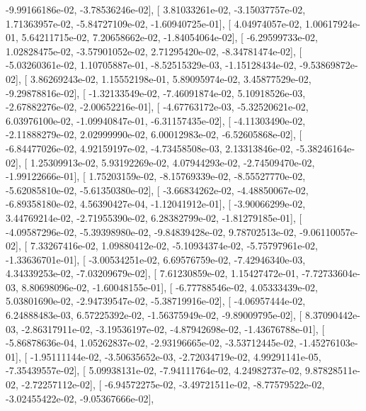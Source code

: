 \documentclass{article}
\begin{document}
         -9.99166186e-02,  -3.78536246e-02],
       [  3.81033261e-02,  -3.15037757e-02,   1.71363957e-02,
         -5.84727109e-02,  -1.60940725e-01],
       [  4.04974057e-02,   1.00617924e-01,   5.64211715e-02,
          7.20658662e-02,  -1.84054064e-02],
       [ -6.29599733e-02,   1.02828475e-02,  -3.57901052e-02,
          2.71295420e-02,  -8.34781474e-02],
       [ -5.03260361e-02,   1.10705887e-01,  -8.52515329e-03,
         -1.15128434e-02,  -9.53869872e-02],
       [  3.86269243e-02,   1.15552198e-01,   5.89095974e-02,
          3.45877529e-02,  -9.29878816e-02],
       [ -1.32133549e-02,  -7.46091874e-02,   5.10918526e-03,
         -2.67882276e-02,  -2.00652216e-01],
       [ -4.67763172e-03,  -5.32520621e-02,   6.03976100e-02,
         -1.09940847e-01,  -6.31157435e-02],
       [ -4.11303490e-02,  -2.11888279e-02,   2.02999990e-02,
          6.00012983e-02,  -6.52605868e-02],
       [ -6.84477026e-02,   4.92159197e-02,  -4.73458508e-03,
          2.13313846e-02,  -5.38246164e-02],
       [  1.25309913e-02,   5.93192269e-02,   4.07944293e-02,
         -2.74509470e-02,  -1.99122666e-01],
       [  1.75203159e-02,  -8.15769339e-02,  -8.55527770e-02,
         -5.62085810e-02,  -5.61350380e-02],
       [ -3.66834262e-02,  -4.48850067e-02,  -6.89358180e-02,
          4.56390427e-04,  -1.12041912e-01],
       [ -3.90066299e-02,   3.44769214e-02,  -2.71955390e-02,
          6.28382799e-02,  -1.81279185e-01],
       [ -4.09587296e-02,  -5.39398980e-02,  -9.84839428e-02,
          9.78702513e-02,  -9.06110057e-02],
       [  7.33267416e-02,   1.09880412e-02,  -5.10934374e-02,
         -5.75797961e-02,  -1.33636701e-01],
       [ -3.00534251e-02,   6.69576759e-02,  -7.42946340e-03,
          4.34339253e-02,  -7.03209679e-02],
       [  7.61230859e-02,   1.15427472e-01,  -7.72733604e-03,
          8.80698096e-02,  -1.60048155e-01],
       [ -6.77788546e-02,   4.05333439e-02,   5.03801690e-02,
         -2.94739547e-02,  -5.38719916e-02],
       [ -4.06957444e-02,   6.24888483e-03,   6.57225392e-02,
         -1.56375949e-02,  -9.89009795e-02],
       [  8.37090442e-03,  -2.86317911e-02,  -3.19536197e-02,
         -4.87942698e-02,  -1.43676788e-01],
       [ -5.86878636e-04,   1.05262837e-02,  -2.93196665e-02,
         -3.53712445e-02,  -1.45276103e-01],
       [ -1.95111144e-02,  -3.50635652e-03,  -2.72034719e-02,
          4.99291141e-05,  -7.35439557e-02],
       [  5.09938131e-02,  -7.94111764e-02,   4.24982737e-02,
          9.87828511e-02,  -2.72257112e-02],
       [ -6.94572275e-02,  -3.49721511e-02,  -8.77579522e-02,
         -3.02455422e-02,  -9.05367666e-02],
\end{document}
